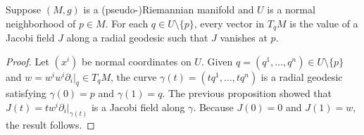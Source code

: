 \begin{corollary}\label{Riemann value of Jacobi field along radial}
Suppose $(M,g)$ is a (pseudo-)Riemannian manifold and $U$ is a normal neighborhood of $p\in M$. For each $q\in U\setminus\{p\}$, every vector in $T_qM$ is 
the value of a Jacobi field $J$ along a radial geodesic such that $J$ vanishes at $p$.
\end{corollary}
\begin{proof}
Let $(x^i)$ be normal coordinates on $U$. Given $q=(q^1,\dots,q^n)\in U\setminus\{p\}$ and $w=w^iw^i\partial_i|_q\in T_qM$, the curve $\gamma(t)=(tq^1,\dots,tq^n)$ is a 
radial geodesic satisfying $\gamma(0)=p$ and $\gamma(1)=q$. The previous proposition showed that $J(t)=tw^i\partial_i|_{\gamma(t)}$ is a Jacobi field along $\gamma$. 
Because $J(0)=0$ and $J(1)=w$, the result follows.
\end{proof}
